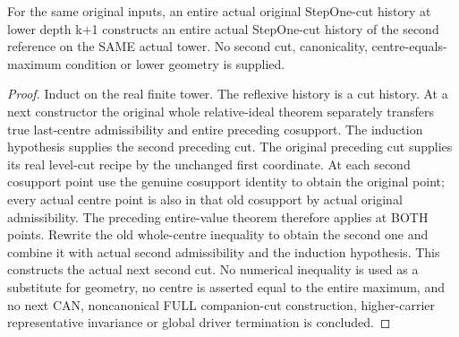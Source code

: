 \begin{theorem}
\label{hir:original-bound-two-stepone-representative-cut}
\leanok
For the same original inputs, an entire actual original StepOne-cut history
at lower depth k+1 constructs an entire actual StepOne-cut history of the
second reference on the SAME actual tower. No second cut, canonicality,
centre-equals-maximum condition or lower geometry is supplied.
\end{theorem}
\begin{proof}
Induct on the real finite tower. The reflexive history is a cut history.
At a next constructor the original whole relative-ideal theorem separately
transfers true last-centre admissibility and entire preceding cosupport.
The induction hypothesis supplies the second preceding cut. The original
preceding cut supplies its real level-cut recipe by the unchanged first
coordinate. At each second cosupport point use the genuine cosupport
identity to obtain the original point; every actual centre point is also
in that old cosupport by actual original admissibility. The preceding
entire-value theorem therefore applies at BOTH points. Rewrite the old
whole-centre inequality to obtain the second one and combine it with
actual second admissibility and the induction hypothesis. This constructs
the actual next second cut. No numerical inequality is used as a substitute
for geometry, no centre is asserted equal to the entire maximum, and no
next CAN, noncanonical FULL companion-cut construction, higher-carrier
representative invariance or global driver termination is concluded.
\end{proof}
